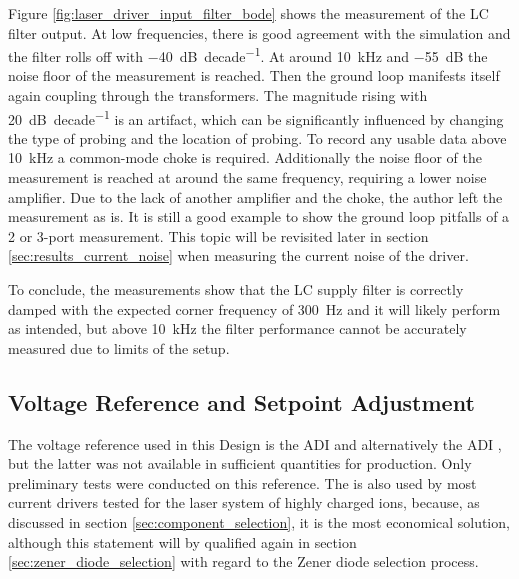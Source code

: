 Figure \ref{fig:laser_driver_input_filter_bode} shows the measurement of the LC filter output. At low frequencies, there is good agreement with the simulation and the filter rolls off with \qty{-40}{\dB \per decade}. At around \qty{10}{\kHz} and \qty{-55}{\dB} the noise floor of the measurement is reached. Then the ground loop manifests itself again coupling through the transformers. The magnitude rising with \qty{20}{\dB \per decade} is an artifact, which can be significantly influenced by changing the type of probing and the location of probing. To record any usable data above \qty{10}{\kHz} a common-mode choke is required. Additionally the noise floor of the measurement is reached at around the same frequency, requiring a lower noise amplifier. Due to the lack of another amplifier and the choke, the author left the measurement as is. It is still a good example to show the ground loop pitfalls of a 2 or 3-port measurement. This topic will be revisited later in section \ref{sec:results_current_noise} when measuring the current noise of the driver.

To conclude, the measurements show that the LC supply filter is correctly damped with the expected corner frequency of \qty{300}{\Hz} and it will likely perform as intended, but above \qty{10}{\kHz} the filter performance cannot be accurately measured due to limits of the setup.

\subsection{Voltage Reference and Setpoint Adjustment}%
\label{sec:voltage_reference}
The voltage reference used in this Design is the ADI  and alternatively the ADI , but the latter was not available in sufficient quantities for production. Only preliminary tests were conducted on this reference. The  is also used by most current drivers tested for the laser system of highly charged ions, because, as discussed in section \ref{sec:component_selection}, it is the most economical solution, although this statement will by qualified again in section \ref{sec:zener_diode_selection} with regard to the Zener diode selection process.

